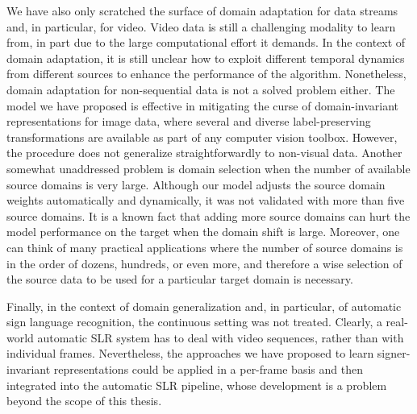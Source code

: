 We have also only scratched the surface of domain adaptation for data streams and, in particular, for video. Video data is still a challenging modality to learn from, in part due to the large computational effort it demands. In the context of domain adaptation, it is still unclear how to exploit different temporal dynamics from different sources to enhance the performance of the algorithm. Nonetheless, domain adaptation for non-sequential data is not a solved problem either. The model we have proposed is effective in mitigating the curse of domain-invariant representations for image data, where several and diverse label-preserving transformations are available as part of any computer vision toolbox. However, the procedure does not generalize straightforwardly to non-visual data. Another somewhat unaddressed problem is domain selection when the number of available source domains is very large. Although our model adjusts the source domain weights automatically and dynamically, it was not validated with more than five source domains. It is a known fact that adding more source domains can hurt the model performance on the target when the domain shift is large. Moreover, one can think of many practical applications where the number of source domains is in the order of dozens, hundreds, or even more, and therefore a wise selection of the source data to be used for a particular target domain is necessary.

Finally, in the context of domain generalization and, in particular, of automatic sign language recognition, the continuous setting was not treated. Clearly, a real-world automatic SLR system has to deal with video sequences, rather than with individual frames. Nevertheless, the approaches we have proposed to learn signer-invariant representations could be applied in a per-frame basis and then integrated into the automatic SLR pipeline, whose development is a problem beyond the scope of this thesis.
